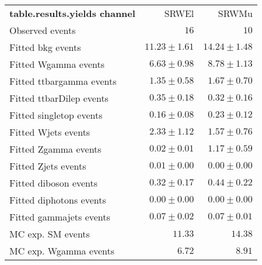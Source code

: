 

\begin{table}
\begin{center}
\setlength{\tabcolsep}{0.0pc}
{\small
\begin{tabular*}{\textwidth}{@{\extracolsep{\fill}}lrr}
\noalign{\smallskip}\hline\noalign{\smallskip}
{\bf table.results.yields channel}           & SRWEl            & SRWMu              \\[-0.05cm]
\noalign{\smallskip}\hline\noalign{\smallskip}
Observed events          & $16$              & $10$                    \\
\noalign{\smallskip}\hline\noalign{\smallskip}
Fitted bkg events         & $11.23 \pm 1.61$          & $14.24 \pm 1.48$              \\
\noalign{\smallskip}\hline\noalign{\smallskip}
        Fitted Wgamma events         & $6.63 \pm 0.98$          & $8.78 \pm 1.13$              \\
        Fitted ttbargamma events         & $1.35 \pm 0.58$          & $1.67 \pm 0.70$              \\
        Fitted ttbarDilep events         & $0.35 \pm 0.18$          & $0.32 \pm 0.16$              \\
        Fitted singletop events         & $0.16 \pm 0.08$          & $0.23 \pm 0.12$              \\
        Fitted Wjets events         & $2.33 \pm 1.12$          & $1.57 \pm 0.76$              \\
        Fitted Zgamma events         & $0.02 \pm 0.01$          & $1.17 \pm 0.59$              \\
        Fitted Zjets events         & $0.01 \pm 0.00$          & $0.00 \pm 0.00$              \\
        Fitted diboson events         & $0.32 \pm 0.17$          & $0.44 \pm 0.22$              \\
        Fitted diphotons events         & $0.00 \pm 0.00$          & $0.00 \pm 0.00$              \\
        Fitted gammajets events         & $0.07 \pm 0.02$          & $0.07 \pm 0.01$              \\
 \noalign{\smallskip}\hline\noalign{\smallskip}
MC exp. SM events              & $11.33$          & $14.38$              \\
\noalign{\smallskip}\hline\noalign{\smallskip}
        MC exp. Wgamma events         & $6.72$          & $8.91$              \\

\end{tabular*}}
\end{center}
\end{table}
